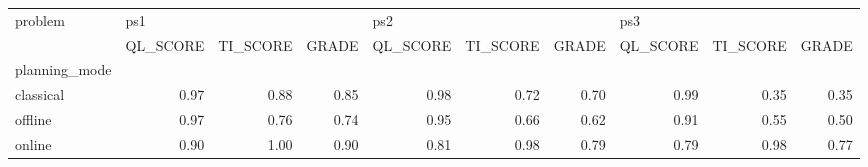 \begin{tabular}{lrrrrrrrrr}
\toprule
problem & \multicolumn{3}{l}{ps1} & \multicolumn{3}{l}{ps2} & \multicolumn{3}{l}{ps3} \\
{} & QL\_SCORE & TI\_SCORE & GRADE & QL\_SCORE & TI\_SCORE & GRADE & QL\_SCORE & TI\_SCORE & GRADE \\
planning\_mode &          &          &       &          &          &       &          &          &       \\
\midrule
classical     &     0.97 &     0.88 &  0.85 &     0.98 &     0.72 &  0.70 &     0.99 &     0.35 &  0.35 \\
offline       &     0.97 &     0.76 &  0.74 &     0.95 &     0.66 &  0.62 &     0.91 &     0.55 &  0.50 \\
online        &     0.90 &     1.00 &  0.90 &     0.81 &     0.98 &  0.79 &     0.79 &     0.98 &  0.77 \\
\bottomrule
\end{tabular}
